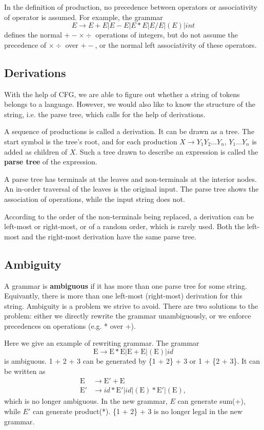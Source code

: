In the definition of production,  no precedence between operators or associativity of operator is assumed. For example, the grammar 
\begin{equation}\label{intops}
E\rightarrow E + E | E - E | E * E | E/E | (E) | int
\end{equation}
defines the normal $+-\times \div$ operations of integers, but do not assume the precedence of $\times \div$ over $+-$, or the normal left associativity of these operators.
\subsection{Derivations}
With the help of CFG, we are able to figure out whether a string of tokens belongs to a language. However, we would also like to know the structure of the string, i.e. the parse tree, which calls for the help of derivations.

A sequence of productions is called a derivation. It can be drawn as a tree. The start symbol is the tree's root, and for each production $X\rightarrow Y_1Y_2\dots Y_n$, $Y_1\dots Y_n$ is added as children of $X$. Such a tree drawn to describe an expression is called the {\bf parse tree} of the expression.

A parse tree has terminals at the leaves and non-terminals at the interior nodes. An in-order traversal of the leaves is the original input. The parse tree shows the association of operations, while the input string does not.

According to the order of the non-terminals being replaced, a derivation can be left-most or right-most, or of a random order, which is rarely used. Both the left-most and the right-most derivation have the same parse tree.
\subsection{Ambiguity}
A grammar is {\bf ambiguous} if it has more than one parse tree for some string. Equivantly, there is more than one left-most (right-most) derivation for this string. Ambiguity is a problem we strive to avoid. There are two solutions to the problem: either we directly rewrite the grammar unambiguously, or we enforce precedences on operations (e.g. * over +).

Here we give an example of rewriting grammar. The grammar
\begin{equation*}
\text{E}\rightarrow \text{E}*\text{E} | \text{E}+\text{E} | (\text{E}) | id
\end{equation*}
is ambiguous. 1 + 2 + 3 can be generated by \{1 + 2\} + 3 or 1 + \{2 + 3\}. It can be written as 
\begin{equation*}
\begin{split}
\text{E}&\rightarrow \text{E}' + \text{E}\\
\text{E}'&\rightarrow id * \text{E}' | id | (\text{E}) * \text{E}' | (\text{E}),
\end{split}
\end{equation*}
which is no longer ambiguous. In the new grammar, $E$ can generate sum(+), while $E'$ can generate product(*). \{1 + 2\} + 3 is no longer legal in the new grammar.

